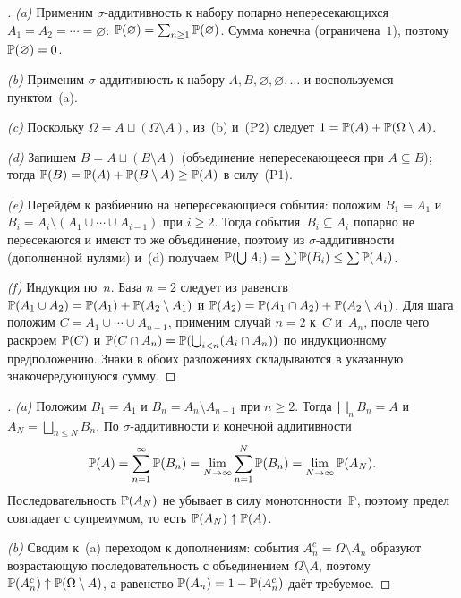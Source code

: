 \begin{proof}[]
\emph{(a)} Применим $\sigma$-аддитивность к набору попарно непересекающихся $A_1 = A_2 = \cdots = \varnothing$: $\mathbb{P}(\varnothing) = \sum_{n \geq 1} \mathbb{P}(\varnothing)$. Сумма конечна (ограничена~$1$), поэтому $\mathbb{P}(\varnothing) = 0$.

\emph{(b)} Применим $\sigma$-аддитивность к набору $A, B, \varnothing, \varnothing, \dots$ и воспользуемся пунктом~(a).

\emph{(c)} Поскольку $\Omega = A \sqcup (\Omega \setminus A)$, из~(b) и~(P2) следует $1 = \mathbb{P}(A) + \mathbb{P}(\Omega \setminus A)$.

\emph{(d)} Запишем $B = A \sqcup (B \setminus A)$ (объединение непересекающееся при $A \subseteq B$); тогда $\mathbb{P}(B) = \mathbb{P}(A) + \mathbb{P}(B \setminus A) \geq \mathbb{P}(A)$ в силу~(P1).

\emph{(e)} Перейдём к разбиению на непересекающиеся события: положим $B_1 = A_1$ и $B_i = A_i \setminus (A_1 \cup \cdots \cup A_{i-1})$ при $i \geq 2$. Тогда события~$B_i \subseteq A_i$ попарно не пересекаются и имеют то же объединение, поэтому из $\sigma$-аддитивности (дополненной нулями) и~(d) получаем $\mathbb{P}(\bigcup A_i) = \sum \mathbb{P}(B_i) \leq \sum \mathbb{P}(A_i)$.

\emph{(f)} Индукция по~$n$. База $n = 2$ следует из равенств $\mathbb{P}(A_1 \cup A_2) = \mathbb{P}(A_1) + \mathbb{P}(A_2 \setminus A_1)$ и $\mathbb{P}(A_2) = \mathbb{P}(A_1 \cap A_2) + \mathbb{P}(A_2 \setminus A_1)$. Для шага положим $C = A_1 \cup \cdots \cup A_{n-1}$, применим случай $n = 2$ к~$C$ и~$A_n$, после чего раскроем $\mathbb{P}(C)$ и $\mathbb{P}(C \cap A_n) = \mathbb{P}(\bigcup_{i < n}(A_i \cap A_n))$ по индукционному предположению. Знаки в обоих разложениях складываются в указанную знакочередующуюся сумму.
\end{proof}

\begin{proof}[]
\emph{(a)} Положим $B_1 = A_1$ и $B_n = A_n \setminus A_{n-1}$ при $n \geq 2$. Тогда $\bigsqcup_{n} B_n = A$ и $A_N = \bigsqcup_{n \leq N} B_n$. По $\sigma$-аддитивности и конечной аддитивности
\[
  \mathbb{P}(A) = \sum_{n=1}^{\infty} \mathbb{P}(B_n) = \lim_{N \to \infty} \sum_{n=1}^{N} \mathbb{P}(B_n) = \lim_{N \to \infty} \mathbb{P}(A_N).
\]
Последовательность $\mathbb{P}(A_N)$ не убывает в силу монотонности~$\mathbb{P}$, поэтому предел совпадает с супремумом, то есть $\mathbb{P}(A_N) \uparrow \mathbb{P}(A)$.

\emph{(b)} Сводим к~(a) переходом к дополнениям: события $A_n^{c} = \Omega \setminus A_n$ образуют возрастающую последовательность с объединением $\Omega \setminus A$, поэтому $\mathbb{P}(A_n^{c}) \uparrow \mathbb{P}(\Omega \setminus A)$, а равенство $\mathbb{P}(A_n) = 1 - \mathbb{P}(A_n^{c})$ даёт требуемое.
\end{proof}

